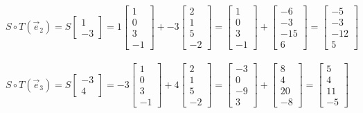 \documentclass{article}
\begin{document}
\\
$S {\circ} T (\vec{e}_{2}) = 
S \begin{bmatrix} 1 \\ -3 \end{bmatrix} =
1 \begin{bmatrix} 1 \\ 0 \\3 \\ -1 \end{bmatrix} + 
-3 \begin{bmatrix} 2 \\ 1 \\ 5\\ -2 \end{bmatrix} = 
\begin{bmatrix} 1 \\ 0 \\3 \\ -1 \end{bmatrix} + 
\begin{bmatrix} -6 \\ -3 \\ -15\\ 6 \end{bmatrix} = 
\begin{bmatrix} -5 \\ -3 \\ -12 \\ 5 \end{bmatrix}$\\
\\
$S {\circ} T (\vec{e}_{3}) = 
S \begin{bmatrix} -3 \\ 4 \end{bmatrix} =
-3 \begin{bmatrix} 1 \\ 0 \\3 \\ -1 \end{bmatrix} + 
4 \begin{bmatrix} 2 \\ 1 \\ 5\\ -2 \end{bmatrix} = \begin{bmatrix} -3 \\ 0 \\-9 \\ 3 \end{bmatrix} + 
\begin{bmatrix} 8 \\ 4 \\ 20 \\ -8 \end{bmatrix} = \begin{bmatrix} 5 \\ 4 \\ 11 \\ -5 \end{bmatrix}$\\
\end{document}
